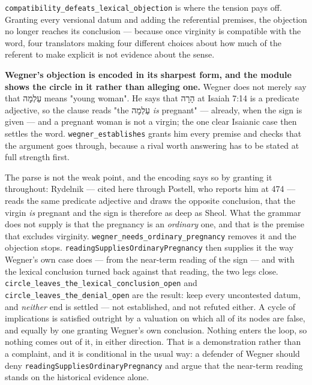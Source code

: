 \documentclass[11pt]{article}
\begin{document}
\texttt{compatibility\_\allowbreak{}defeats\_\allowbreak{}lexical\_\allowbreak{}objection} is where the tension pays off. Granting every versional datum and adding the referential premises, the objection no longer reaches its conclusion — because once virginity is compatible with the word, four translators making four different choices about how much of the referent to make explicit is not evidence about the sense.

\textbf{Wegner's objection is encoded in its sharpest form, and the module shows the circle in it rather than alleging one.} Wegner does not merely say that עַלְמָה means "young woman". He says that הָרָה at Isaiah 7:14 is a predicate adjective, so the clause reads "the עַלְמָה \emph{is} pregnant" — already, when the sign is given — and a pregnant woman is not a virgin; the one clear Isaianic case then settles the word. \texttt{wegner\_\allowbreak{}establishes} grants him every premise and checks that the argument goes through, because a rival worth answering has to be stated at full strength first.

The parse is not the weak point, and the encoding says so by granting it throughout: Rydelnik — cited here through Postell, who reports him at 474 — reads the same predicate adjective and draws the opposite conclusion, that the virgin \emph{is} pregnant and the sign is therefore as deep as Sheol. What the grammar does not supply is that the pregnancy is an \emph{ordinary} one, and that is the premise that excludes virginity. \texttt{wegner\_\allowbreak{}needs\_\allowbreak{}ordinary\_\allowbreak{}pregnancy} removes it and the objection stops. \texttt{reading\allowbreak{}Supplies\allowbreak{}Ordinary\allowbreak{}Pregnancy} then supplies it the way Wegner's own case does — from the near-term reading of the sign — and with the lexical conclusion turned back against that reading, the two legs close. \texttt{circle\_\allowbreak{}leaves\_\allowbreak{}the\_\allowbreak{}lexical\_\allowbreak{}conclusion\_\allowbreak{}open} and \texttt{circle\_\allowbreak{}leaves\_\allowbreak{}the\_\allowbreak{}denial\_\allowbreak{}open} are the result: keep every uncontested datum, and \emph{neither} end is settled — not established, and not refuted either. A cycle of implications is satisfied outright by a valuation on which all of its nodes are false, and equally by one granting Wegner's own conclusion. Nothing enters the loop, so nothing comes out of it, in either direction. That is a demonstration rather than a complaint, and it is conditional in the usual way: a defender of Wegner should deny \texttt{reading\allowbreak{}Supplies\allowbreak{}Ordinary\allowbreak{}Pregnancy} and argue that the near-term reading stands on the historical evidence alone.
\end{document}
